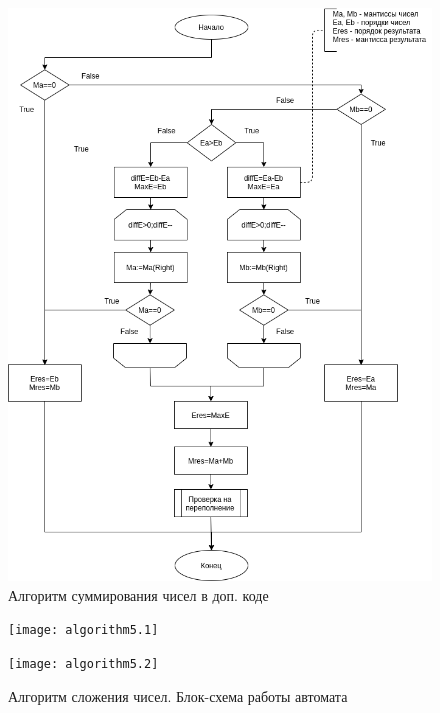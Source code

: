 \documentclass[a4paper,14pt]{extarticle}
\begin{document}
\begin{figure}[h!]
	\centering
	\includegraphics[width=0.7\linewidth]{images/course_algorithm_sum}
	\caption{Алгоритм суммирования чисел в доп. коде}
	\label{fig:coursealgorithmsum}
\end{figure}

\newpage
\begin{figure}[h!]
	\centering
	\texttt{[image: algorithm5.1]}
	\label{fig:coursealgorithmmachine1}
\end{figure}
\begin{figure}[h!]
	\centering
	\texttt{[image: algorithm5.2]}
	\caption {Алгоритм сложения чисел. Блок-схема работы автомата}
	\label{fig:coursealgorithmmachine2}
\end{figure}
\end{document}
